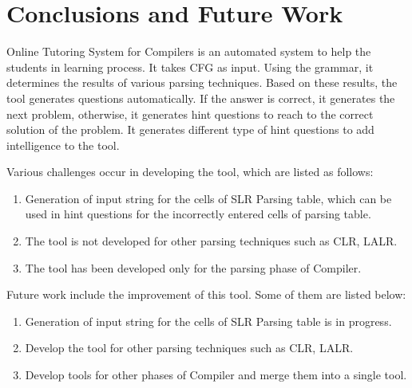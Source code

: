 \chapter{Conclusions and Future Work}
\label{chap:conclusion}
Online Tutoring System for Compilers is an automated system to help the students in learning process. It takes CFG as input. Using the grammar, it determines the results of various parsing techniques. Based on these results, the tool generates questions automatically. If the answer is correct, it generates the next problem, otherwise, it generates hint questions to reach to the correct solution of the problem. It generates different type of hint questions to add intelligence to the tool.

Various challenges occur in developing the tool, which are listed as follows:
\begin{enumerate}
\item Generation of input string for the cells of SLR Parsing table, which can be used in hint questions for the incorrectly entered cells of parsing table.
\item The tool is not developed for other parsing techniques such as CLR, LALR.
\item The tool has been developed only for the parsing phase of Compiler.
\end{enumerate}

Future work include the improvement of this tool. Some of them are listed below:
\begin{enumerate}
\item Generation of input string for the cells of SLR Parsing table is in progress.
\item Develop the tool for other parsing techniques such as CLR, LALR.
\item Develop tools for other phases of Compiler and merge them into a single tool.
\end{enumerate}